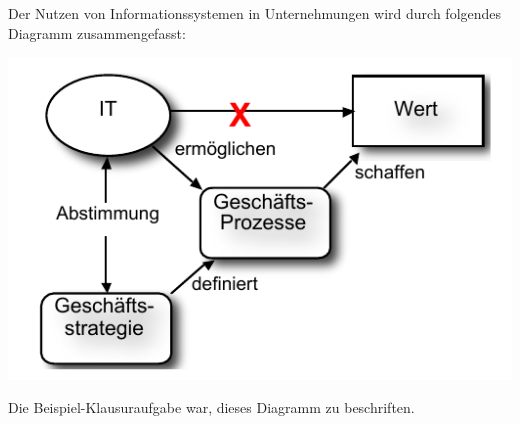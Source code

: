 Der Nutzen von Informationssystemen in Unternehmungen wird durch folgendes Diagramm zusammengefasst:

\begin{center}\includegraphics[width=1\textwidth]{IS-Nutzen.png}\end{center}

Die Beispiel-Klausuraufgabe war, dieses Diagramm zu beschriften.